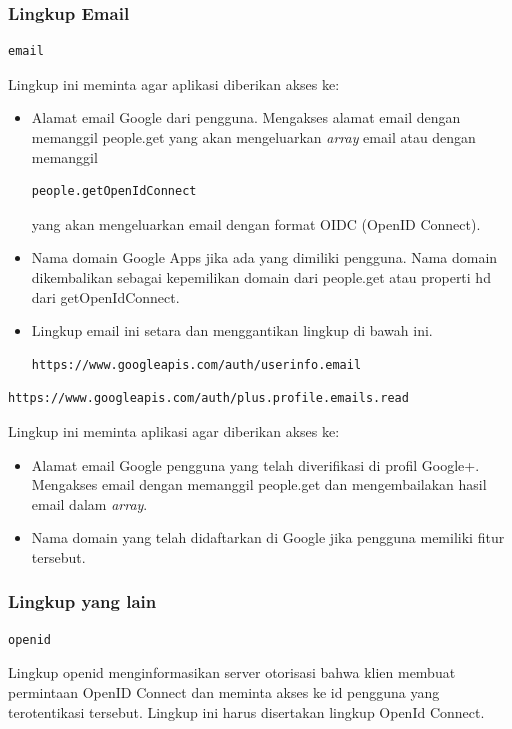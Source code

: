 \subsubsection{Lingkup Email}
\begin{lstlisting}
email
\end{lstlisting}
Lingkup ini meminta agar aplikasi diberikan akses ke:
\begin{itemize}
\item
Alamat email Google dari pengguna. Mengakses alamat email dengan memanggil
people.get yang akan mengeluarkan {\it array} email atau dengan memanggil
\begin{lstlisting}
people.getOpenIdConnect
\end{lstlisting}
yang akan mengeluarkan email dengan format OIDC (OpenID Connect).
\item
Nama domain Google Apps jika ada yang dimiliki pengguna. Nama domain
dikembalikan sebagai kepemilikan domain dari people.get atau properti hd dari
getOpenIdConnect.
\item
Lingkup email ini setara dan menggantikan lingkup di bawah ini.
\begin{lstlisting}
https://www.googleapis.com/auth/userinfo.email
\end{lstlisting}
\end{itemize}
\begin{lstlisting}
https://www.googleapis.com/auth/plus.profile.emails.read
\end{lstlisting}
Lingkup ini meminta aplikasi agar diberikan akses ke:
\begin{itemize}
\item
Alamat email Google pengguna yang telah diverifikasi di profil Google+.
Mengakses email dengan memanggil people.get dan mengembailakan hasil email dalam
{\it array}.
\item
Nama domain yang telah didaftarkan di Google jika pengguna memiliki fitur
tersebut.
\end{itemize}

\subsubsection{Lingkup yang lain}
\begin{lstlisting}
openid
\end{lstlisting}
Lingkup openid menginformasikan server otorisasi bahwa klien membuat permintaan
OpenID Connect dan meminta akses ke id pengguna yang terotentikasi tersebut.
Lingkup ini harus disertakan lingkup OpenId Connect.

